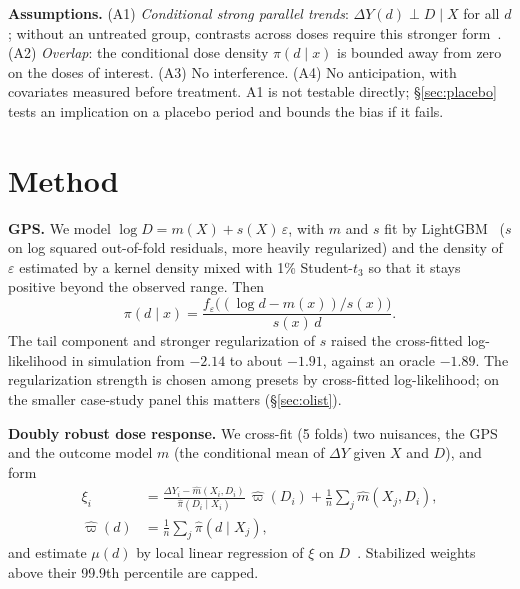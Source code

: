 \documentclass[sigconf,anonymous,review]{acmart}
\begin{document}
\textbf{Assumptions.} (A1) \emph{Conditional strong parallel trends}: $\Delta Y(d)\perp D\mid X$ for all $d$; without an untreated group, contrasts across doses require this stronger form~\cite{callaway2024difference}. (A2) \emph{Overlap}: the conditional dose density $\pi(d\mid x)$ is bounded away from zero on the doses of interest. (A3) No interference. (A4) No anticipation, with covariates measured before treatment. A1 is not testable directly; \S\ref{sec:placebo} tests an implication on a placebo period and bounds the bias if it fails.

\section{Method}\label{sec:method}

\textbf{GPS.} We model $\log D = m(X)+s(X)\,\varepsilon$, with $m$ and $s$ fit by LightGBM~\cite{ke2017lightgbm} ($s$ on log squared out-of-fold residuals, more heavily regularized) and the density of $\varepsilon$ estimated by a kernel density mixed with 1\% Student-$t_3$ so that it stays positive beyond the observed range. Then
\[\pi(d\mid x)=\frac{f_\varepsilon\big((\log d-m(x))/s(x)\big)}{s(x)\,d}.\] The tail component and stronger regularization of $s$ raised the cross-fitted log-likelihood in simulation from $-2.14$ to about $-1.91$, against an oracle $-1.89$. The regularization strength is chosen among presets by cross-fitted log-likelihood; on the smaller case-study panel this matters (\S\ref{sec:olist}).

\textbf{Doubly robust dose response.} We cross-fit (5 folds) two nuisances, the GPS and the outcome model $m$ (the conditional mean of $\Delta Y$ given $X$ and $D$), and form
\begin{align}
\xi_i&=\frac{\Delta Y_i-\hat m(X_i,D_i)}{\hat\pi(D_i\mid X_i)}\,\hat\varpi(D_i)+\frac1n\sum_j\hat m(X_j,D_i),\\
\hat\varpi(d)&=\frac1n\sum_j\hat\pi(d\mid X_j),
\end{align}
and estimate $\mu(d)$ by local linear regression of $\xi$ on $D$~\cite{kennedy2017nonparametric}. Stabilized weights above their 99.9th percentile are capped.
\end{document}
